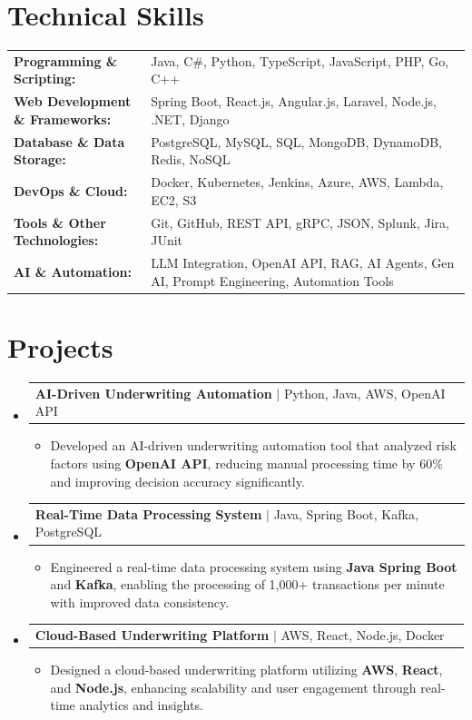 \documentclass[letterpaper,10pt]{article}
\makeatletter
\newcommand{\resumeItem}[1]{
  \item{\fontsize{8pt}{9pt}\selectfont
    #1 \vspace{-3pt}
  }
}
\newcommand{\resumeProjectHeading}[2]{
    \item
    \begin{tabular*}{1.001\textwidth}{l@{\extracolsep{\fill}}r}
      \fontsize{8.5pt}{10pt}#1 & \textbf{\fontsize{8.5pt}{10pt} #2}\\
    \end{tabular*}\vspace{-7pt}
}
\newcommand{\resumeSubHeadingListStart}{\begin{itemize}[leftmargin=0pt, label={}]}
\newcommand{\resumeSubHeadingListEnd}{\end{itemize}}
\newcommand{\resumeItemListStart}{\begin{itemize}[leftmargin=*]}
\newcommand{\resumeItemListEnd}{\end{itemize}\vspace{-5pt}}
\makeatother
\begin{document}
\section{Technical Skills}
        \vspace{-14pt}
        \begin{table}[h]
            \fontsize{8pt}{9pt}\selectfont
            \begin{tabular}{p{0.3\linewidth} p{0.7\linewidth}}
                \textbf{Programming \& Scripting:} & Java, C\#, Python, TypeScript, JavaScript, PHP, Go, C++ \\
                \textbf{Web Development \& Frameworks:} & Spring Boot, React.js, Angular.js, Laravel, Node.js, .NET, Django \\
                \textbf{Database \& Data Storage:} & PostgreSQL, MySQL, SQL, MongoDB, DynamoDB, Redis, NoSQL \\
                \textbf{DevOps \& Cloud:} & Docker, Kubernetes, Jenkins, Azure, AWS, Lambda, EC2, S3 \\
                \textbf{Tools \& Other Technologies:} & Git, GitHub, REST API, gRPC, JSON, Splunk, Jira, JUnit \\
                \textbf{AI \& Automation:} & LLM Integration, OpenAI API, RAG, AI Agents, Gen AI, Prompt Engineering, Automation Tools \\
            \end{tabular}
        \end{table}
 \vspace{-18pt}

\section{Projects}
    \vspace{-5pt}
    \resumeSubHeadingListStart
          \resumeProjectHeading
            {\textbf{AI-Driven Underwriting Automation} $|$ Python, Java, AWS, OpenAI API}{}
            \resumeItemListStart
                \resumeItem{Developed an AI-driven underwriting automation tool that analyzed risk factors using \textbf{OpenAI API}, reducing manual processing time by 60\% and improving decision accuracy significantly.}
            \resumeItemListEnd
        \vspace{-12pt}
    
        \resumeProjectHeading
            {\textbf{Real-Time Data Processing System} $|$ Java, Spring Boot, Kafka, PostgreSQL}{}
        \resumeItemListStart
                \resumeItem{Engineered a real-time data processing system using \textbf{Java Spring Boot} and \textbf{Kafka}, enabling the processing of 1,000+ transactions per minute with improved data consistency.}
        \resumeItemListEnd
      \vspace{-12pt}
      \resumeProjectHeading
        {\textbf{Cloud-Based Underwriting Platform} $|$ AWS, React, Node.js, Docker}{}
    \resumeItemListStart
            \resumeItem{Designed a cloud-based underwriting platform utilizing \textbf{AWS}, \textbf{React}, and \textbf{Node.js}, enhancing scalability and user engagement through real-time analytics and insights.}
    \resumeItemListEnd
    \resumeSubHeadingListEnd
\end{document}
